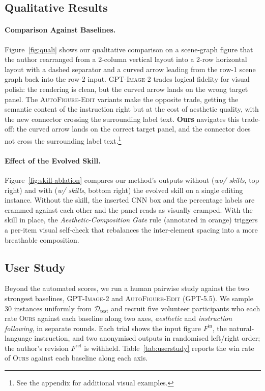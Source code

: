 \documentclass[11pt]{article}
\begin{document}
\subsection{Qualitative Results}
\label{sec:exp-qualitative}

\paragraph{Comparison Against Baselines.}
Figure~\ref{fig:quali} shows our qualitative comparison on
a scene-graph figure that the author rearranged from a
2-column vertical layout into a 2-row horizontal layout with
a dashed separator and a curved arrow leading from the row-1
scene graph back into the row-2 input.
\textsc{GPT-Image-2} trades logical fidelity for visual
polish: the rendering is clean, but the curved arrow lands
on the wrong target panel.  The
\textsc{AutoFigure-Edit} variants make the opposite trade,
getting the semantic content of the instruction right but at
the cost of aesthetic quality, with the new connector
crossing the surrounding label text.  \textbf{Ours} navigates
this trade-off: the curved arrow lands on the correct target
panel, and the connector does not cross the surrounding
label text.\footnote{See the appendix for additional visual
examples.}

\paragraph{Effect of the Evolved Skill.}
Figure~\ref{fig:skill-ablation} compares our method's
outputs without (\emph{wo/ skills}, top right) and with
(\emph{w/ skills}, bottom right) the evolved skill on a
single editing instance.  Without the skill, the inserted
CNN box and the percentage labels are crammed against each
other and the panel reads as visually cramped.  With the
skill in place, the \emph{Aesthetic-Composition Gate} rule
(annotated in orange) triggers a per-item visual self-check
that rebalances the inter-element spacing into a more
breathable composition.

\subsection{User Study}
\label{sec:user-study}

Beyond the automated scores, we run a human pairwise study
against the two strongest baselines, \textsc{GPT-Image-2}
and \textsc{AutoFigure-Edit} (\textsc{GPT-5.5}).  We sample 30
instances uniformly from $\mathcal{D}_{\mathrm{test}}$ and
recruit five volunteer participants who each rate
\textsc{Ours} against each baseline along two axes,
\emph{aesthetic} and \emph{instruction following}, in
separate rounds.  Each trial shows the input figure
$F^{\mathrm{in}}$, the natural-language instruction, and two
anonymised outputs in randomised left/right order; the
author's revision $F^{\mathrm{ref}}$ is withheld.
Table~\ref{tab:userstudy} reports the win rate of
\textsc{Ours} against each baseline along each axis.
\end{document}
